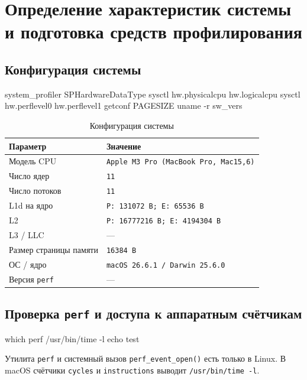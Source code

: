 \chapter{Определение характеристик системы и подготовка средств профилирования}
\label{ch:system}

\section{Конфигурация системы}

\begin{commands}
system_profiler SPHardwareDataType
sysctl hw.physicalcpu hw.logicalcpu
sysctl hw.perflevel0 hw.perflevel1
getconf PAGESIZE
uname -r
sw_vers
\end{commands}

\begin{table}[H]
\caption{Конфигурация системы}
\label{tab:system}
\begin{tabularx}{\textwidth}{|l|X|}
	\hline
	Параметр & Значение \\
	\hline
	Модель CPU & \texttt{Apple M3 Pro (MacBook Pro, Mac15,6)} \\
	\hline
	Число ядер & \texttt{11} \\
	\hline
	Число потоков & \texttt{11} \\
	\hline
	L1d на ядро & \texttt{P: 131072 B; E: 65536 B} \\
	\hline
	L2 & \texttt{P: 16777216 B; E: 4194304 B} \\
	\hline
	L3 / LLC & --- \\
	\hline
	Размер страницы памяти & \texttt{16384 B} \\
	\hline
	ОС / ядро & \texttt{macOS 26.6.1 / Darwin 25.6.0} \\
	\hline
	Версия \texttt{perf} & --- \\
	\hline
\end{tabularx}
\end{table}

\section{Проверка \texttt{perf} и доступа к аппаратным счётчикам}
\label{sec:tools}

\begin{commands}
which perf
/usr/bin/time -l echo test
\end{commands}

Утилита \texttt{perf} и системный вызов \texttt{perf\_event\_open()} есть только в Linux.
В macOS счётчики \texttt{cycles} и \texttt{instructions} выводит \texttt{/usr/bin/time -l}.

